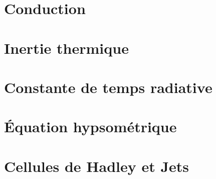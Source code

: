 \documentclass[a4paper,DIV16,10pt]{scrartcl}
\begin{document}
\newpage
\section{Conduction}


\newpage
\section{Inertie thermique}


\newpage
\section{Constante de temps radiative}


\newpage
\section{\'Equation hypsométrique}


\newpage
\section{Cellules de Hadley et Jets}


%
\end{document}
